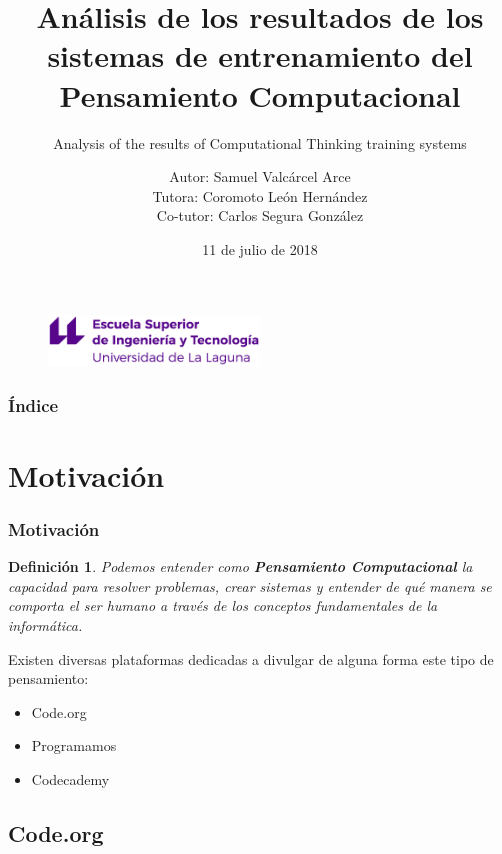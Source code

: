 \documentclass{beamer}
\title[Defensa Oral TFG]{Análisis de los resultados de los sistemas de entrenamiento del Pensamiento Computacional}
\subtitle{Analysis of the results of Computational Thinking training systems}
\author[Samuel Valcárcel Arce]{\footnotesize Autor: Samuel Valcárcel Arce \\ Tutora: Coromoto León Hernández \\ Co-tutor: Carlos Segura González}
\institute[ULL]{Universidad de La Laguna}
\date[11 de julio de 2018]{11 de julio de 2018}
\newtheorem{definicion}{Definición}
\begin{document}
  
\begin{frame}
  \begin{figure}
  \includegraphics[width=0.5\textwidth]{img/logo_nuevo.eps}
  \end{figure}
  \hspace*{7.5cm}
  \titlepage

\end{frame}

\begin{frame}
  \frametitle{Índice}  
  \tableofcontents[pausesections]
\end{frame}

\section{Motivación}

\begin{frame}

\frametitle{Motivación}

\begin{definicion}
    Podemos entender como \textbf{Pensamiento Computacional} la capacidad para resolver problemas, crear sistemas y entender de qué manera se comporta 
    el ser humano a través de los conceptos fundamentales de la informática.
\end{definicion}

Existen diversas plataformas dedicadas a divulgar de alguna forma este tipo de pensamiento:
\begin{itemize}
    \item Code.org
    \item Programamos
    \item Codecademy
\end{itemize}

\end{frame}
\subsection{Code.org}
\end{document}
